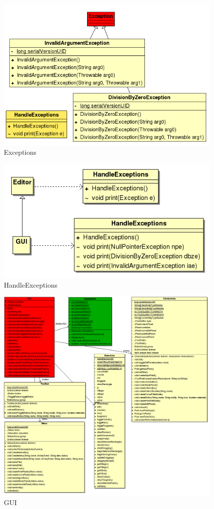 \documentclass[a4paper,11pt,oneside, titlepage]{article}
\begin{document}
\begin{figure}[htbp]
\centering
\includegraphics[scale=0.4]{./UML2/Exc.png}
\caption{Exceptions}\label{iExc}
\end{figure}
\begin{figure}[htbp]
\centering
\includegraphics[scale=0.4]{./UML2/HandleExc.png}
\caption{HandleExceptions}\label{iHExc}
\end{figure}
\begin{figure}[htbp]
\centering
\includegraphics[scale=0.4]{./UML2/GUI.png}
\caption{GUI}\label{iGui}
\end{figure}
\end{document}
